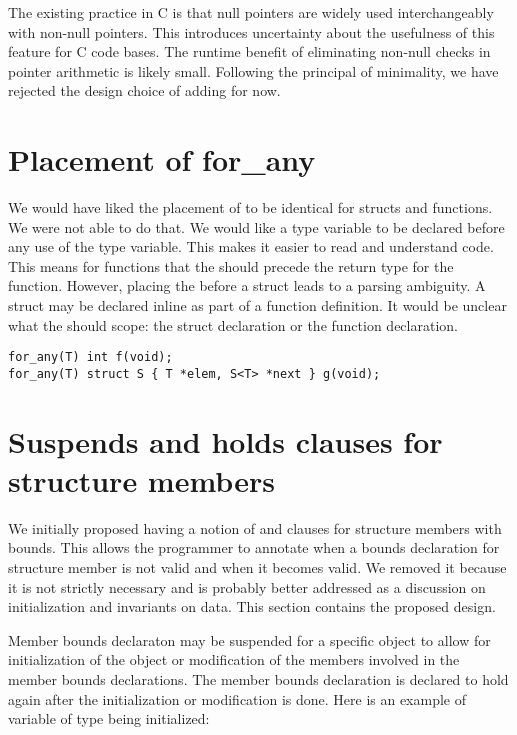 The existing practice in C is that null pointers are widely used interchangeably
with non-null pointers.  This introduces uncertainty about the usefulness of this 
feature for C code bases.  The runtime benefit of eliminating non-null
checks in pointer arithmetic is likely small.  Following the principal of 
minimality, we have rejected the design choice of adding  
for now. 

\section{Placement of for\_any}
\label{section:foranyalternatives}
We would have liked the placement of \forany{} to be identical for structs
and functions.  We were not able to do that. We would like a type variable to be declared 
before any use of the type variable.  This makes it easier to read and understand
code.  This means for functions that the \forany{} should precede the
return type for the function.  However, placing the \forany{} before 
a struct leads to a parsing ambiguity.  A struct may be declared inline as
part of a function definition.  It would be unclear what the \forany{} should
scope: the struct declaration or the function declaration.
\begin{verbatim}
for_any(T) int f(void);
for_any(T) struct S { T *elem, S<T> *next } g(void);
\end{verbatim}

\section{Suspends and holds clauses for structure members}

We initially proposed having a notion of  and  clauses
for structure members with bounds.  This allows the programmer to annotate when
a bounds declaration for structure member is not valid and when it becomes valid.
We removed it because it is not strictly necessary and is probably better addressed
as a discussion on initialization and invariants on data.   This section contains
the proposed design.

Member bounds declaraton may be suspended for a specific
object to allow for initialization of the object or modification of the
members involved in the member bounds declarations. The member bounds
declaration is declared to hold again after the initialization or modification is done.
Here is an example of variable of type  being initialized:


